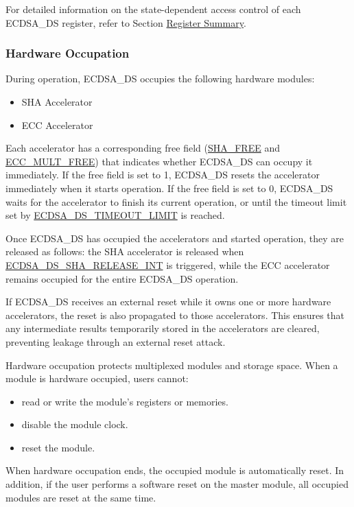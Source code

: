 \documentclass[main\_\_EN.tex]{subfiles}
\begin{document}
For detailed information on the state-dependent access control of each ECDSA\_DS register, refer to Section \hyperref[sec:ecdsa-reg-summ]{Register Summary}.

\subsubsection{Hardware Occupation}

During operation, ECDSA\_DS occupies the following hardware modules:

\begin{itemize}
    \item SHA Accelerator
    \item ECC Accelerator
\end{itemize}

Each accelerator has a corresponding free field (\hyperref[fielddesc:SHAFREE]{SHA\_FREE} and \hyperref[fielddesc:ECCMULTFREE]{ECC\_MULT\_FREE}) that indicates whether ECDSA\_DS can occupy it immediately. If the free field is set to 1, ECDSA\_DS resets the accelerator immediately when it starts operation. If the free field is set to 0, ECDSA\_DS waits for the accelerator to finish its current operation, or until the timeout limit set by \hyperref[fielddesc:ECDSADSTIMEOUTLIMIT]{ECDSA\_DS\_TIMEOUT\_LIMIT} is reached.

Once ECDSA\_DS has occupied the accelerators and started operation, they are released as follows: the SHA accelerator is released when \hyperref[int:ECDSADSSHARELEASEINT]{ECDSA\_DS\_SHA\_RELEASE\_INT} is triggered, while the ECC accelerator remains occupied for the entire ECDSA\_DS operation.

If ECDSA\_DS receives an external reset while it owns one or more hardware accelerators, the reset is also propagated to those accelerators. This ensures that any intermediate results temporarily stored in the accelerators are cleared, preventing leakage through an external reset attack.

\begin{tiplisting}
Hardware occupation protects multiplexed modules and storage space. When a module is hardware occupied, users cannot:
\vspace{-0.5em}
\begin{itemize}
    \item read or write the module's registers or memories.
    \item disable the module clock.
    \item reset the module.
\end{itemize}
\vspace{-0.5em}
When hardware occupation ends, the occupied module is automatically reset. In addition, if the user performs a software reset on the master module, all occupied modules are reset at the same time.
\end{tiplisting}
\end{document}
